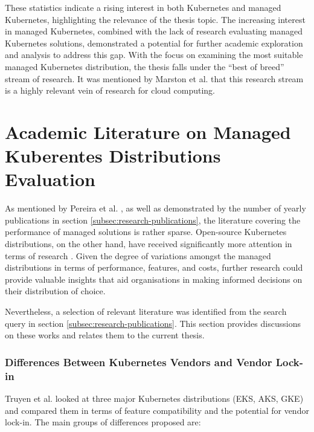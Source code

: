 These statistics indicate a rising interest in both Kubernetes and managed Kubernetes, highlighting the relevance of the thesis topic. The increasing interest in managed Kubernetes, combined with the lack of research evaluating managed Kubernetes solutions, demonstrated a potential for further academic exploration and analysis to address this gap. With the focus on examining the most suitable managed Kubernetes distribution, the thesis falls under the ``best of breed'' stream of research. It was mentioned by Marston et al. \cite{MARSTON2011176} that this research stream is a highly relevant vein of research for cloud computing.

\section{Academic Literature on Managed Kuberentes Distributions Evaluation}

As mentioned by Pereira et al. \cite{pereiraferreiraPerformanceEvaluationContainers2019}, as well as demonstrated by the number of yearly publications in section \ref{subsec:research-publications}, the literature covering the performance of managed solutions is rather sparse. Open-source Kubernetes distributions, on the other hand, have received significantly more attention in terms of research \cite{bohmProfilingLightweightContainer2021,koziolekLightweightKubernetesDistributions2023,ascensaoAssessingKubernetesDistributions2024,9660392,bryantKubernetesDeploymentOptions2024}. Given the degree of variations amongst the managed distributions in terms of performance, features, and costs, further research could provide valuable insights that aid organisations in making informed decisions on their distribution of choice.

Nevertheless, a selection of relevant literature was identified from the search query in section \ref{subsec:research-publications}. This section provides discussions on these works and relates them to the current thesis.

\subsubsection{Differences Between Kubernetes Vendors and Vendor Lock-in}
Truyen et al. \cite{truyenManagingFeatureCompatibility2020} looked at three major Kubernetes distributions (EKS, AKS, GKE) and compared them in terms of feature compatibility and the potential for vendor lock-in. The main groups of differences proposed are:

